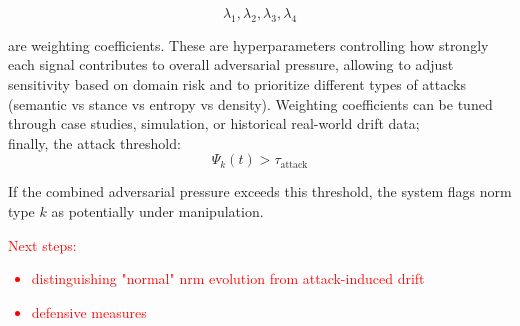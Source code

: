 \documentclass{article}
\begin{document}
\[
\lambda_1,\lambda_2,\lambda_3,\lambda_4
\]

are weighting coefficients. These are hyperparameters controlling how strongly each signal contributes to overall adversarial pressure, allowing to adjust sensitivity based on domain risk and to prioritize different types of attacks (semantic vs stance vs entropy vs density). Weighting coefficients can be tuned through case studies, simulation, or historical real-world drift data; \\

finally, the attack threshold:
\[
\Psi_k(t) > \tau_{\text{attack}}
\]

If the combined adversarial pressure exceeds this threshold, the system flags norm type \(k\) as potentially under manipulation. \\


\textcolor{red}{Next steps: 
\begin{itemize}
    \item distinguishing "normal" nrm evolution from attack-induced drift
    \item defensive measures
\end{itemize}
}
\end{document}
